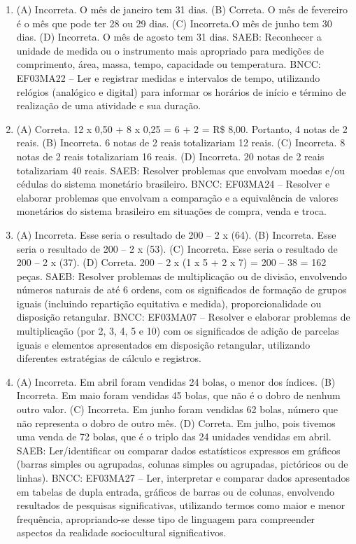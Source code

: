 \begin{enumerate}
\item
(A) Incorreta. O mês de janeiro tem 31 dias.
(B) Correta. O mês de fevereiro é o mês que pode ter 28 ou 29 dias.
(C) Incorreta.O mês de junho tem 30 dias.
(D) Incorreta. O mês de agosto tem 31 dias.
SAEB: Reconhecer a unidade de medida ou o instrumento mais apropriado para medições de comprimento, área, massa, tempo, capacidade ou temperatura.
BNCC: EF03MA22 -- Ler e registrar medidas e intervalos de tempo, utilizando relógios (analógico e
digital) para informar os horários de início e término de realização de uma atividade e sua
duração.

\item
(A) Correta. 12 x 0,50 + 8 x 0,25 = 6 + 2 = R\$ 8,00. Portanto, 4 notas de 2 reais.
(B) Incorreta. 6 notas de 2 reais totalizariam 12 reais.
(C) Incorreta. 8 notas de 2 reais totalizariam 16 reais.
(D) Incorreta. 20 notas de 2 reais totalizariam 40 reais.
SAEB: Resolver problemas que envolvam moedas e/ou cédulas do sistema monetário brasileiro.
BNCC: EF03MA24 -- Resolver e elaborar problemas que envolvam a comparação e a equivalência de
valores monetários do sistema brasileiro em situações de compra, venda e troca.

\item
(A) Incorreta. Esse seria o resultado de 200 -- 2 x (64).
(B) Incorreta. Esse seria o resultado de 200 -- 2 x (53).
(C) Incorreta. Esse seria o resultado de 200 -- 2 x (37).
(D) Correta. 200 -- 2 x (1 x 5 + 2 x 7) = 200 -- 38 = 162 peças.
SAEB: Resolver problemas de multiplicação ou de divisão, envolvendo números naturais de até 6 ordens, com os significados de formação de grupos iguais (incluindo repartição equitativa e medida), proporcionalidade ou disposição retangular.
BNCC: EF03MA07 – Resolver e elaborar problemas de multiplicação (por 2, 3, 4, 5 e 10) com os
significados de adição de parcelas iguais e elementos apresentados em disposição retangular, utilizando diferentes estratégias de cálculo e registros.

\item
(A) Incorreta. Em abril foram vendidas 24 bolas, o menor dos índices.
(B) Incorreta. Em maio foram vendidas 45 bolas, que não é o dobro de nenhum outro valor.
(C) Incorreta. Em junho foram vendidas 62 bolas, número que não representa o dobro de outro mês.
(D) Correta. Em julho, pois tivemos uma venda de 72 bolas, que é o triplo das 24 unidades vendidas em abril.
SAEB: Ler/identificar ou comparar dados estatísticos
expressos em gráficos (barras simples ou agrupadas, colunas simples ou agrupadas, pictóricos ou de linhas).
BNCC: EF03MA27 -- Ler, interpretar e comparar dados apresentados em tabelas de dupla entrada,
gráficos de barras ou de colunas, envolvendo resultados de pesquisas significativas, utilizando
termos como maior e menor frequência, apropriando-se desse tipo de linguagem para compreender aspectos da realidade sociocultural significativos.


\end{enumerate}
